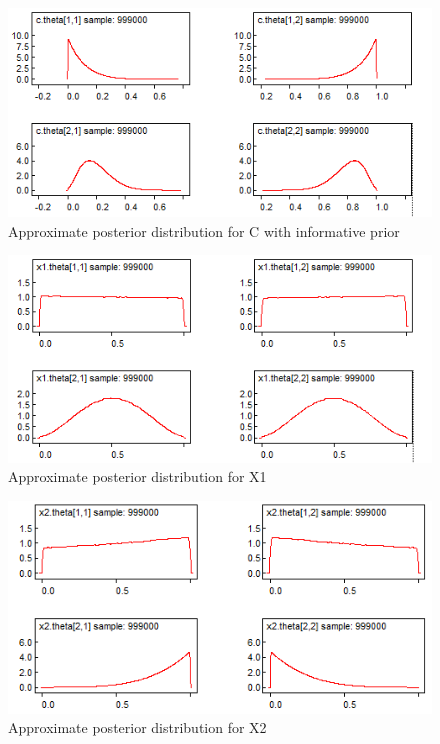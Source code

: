 \documentclass[12pt]{article} %
\begin{document}
\begin{figure}[h!]
  \centering
  \includegraphics[width=\linewidth]{bugs_graphs/c_2.png}
  \caption{Approximate posterior distribution for C with informative prior}
  \label{fig:C_2 Posterior}
\end{figure}

\begin{figure}[h!]
  \centering
  \includegraphics[width=\linewidth]{bugs_graphs/x1_2.png}
  \caption{Approximate posterior distribution for X1}
  \label{fig:X1_2 Posterior}
\end{figure}

\begin{figure}[h!]
  \centering
  \includegraphics[width=\linewidth]{bugs_graphs/x2_2.png}
  \caption{Approximate posterior distribution for X2}
  \label{fig:X2_2 Posterior}
\end{figure}
\end{document}

